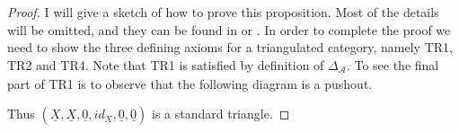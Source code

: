 \documentclass[11pt]{article}
\theoremstyle{definition}
\theoremstyle{remark}
\begin{document}
            \begin{proof}
                I will give a sketch of how to prove this proposition. Most of the details will be omitted, and they can be found in \cite{Mat20} or \cite{May01}. In order to complete the proof we need to show the three defining axioms for a triangulated category, namely TR1, TR2 and TR4. Note that TR1 is satisfied by definition of $\Delta_{\underline{\mathcal{A}}}$. To see the final part of TR1 is to observe that the following diagram is a pushout.
                \begin{center}
                \end{center}
                Thus $(\underline{X},\underline{X},\underline{0},id_{\underline{X}},\underline{0},\underline{0})$ is a standard triangle.

                

\end{proof}
\end{document}
